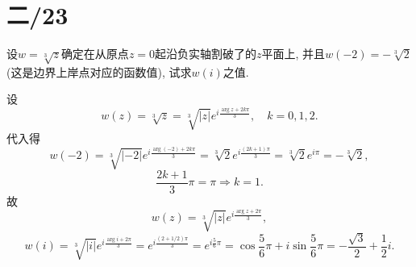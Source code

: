 \documentclass[11pt,a4paper]{article}
\begin{document}
\section{二/23}
\begin{problem}
设$w=\sqrt[3]{z}$确定在从原点$z=0$起沿负实轴割破了的$z$平面上, 并且$w(-2)=-\sqrt[3]{2}$(这是边界上岸点对应的函数值), 试求$w(i)$之值.
\end{problem}
设
$$w(z)=\sqrt[3]{z}=\sqrt[3]{|z|}e^{i\frac{\arg z+2k\pi}{3}},\quad k=0,1,2.$$
代入得
$$w(-2)=\sqrt[3]{|-2|}e^{i\frac{\arg(-2)+2k\pi}{3}}=\sqrt[3]{2}e^{i\frac{(2k+1)\pi}{3}}=\sqrt[3]{2}e^{i\pi}=-\sqrt[3]{2},$$
$$\frac{2k+1}{3}\pi=\pi\Longrightarrow k=1.$$
故
$$w(z)=\sqrt[3]{|z|}e^{i\frac{\arg z+2\pi}{3}},$$
$$w(i)=\sqrt[3]{|i|}e^{i\frac{\arg i+2\pi}{3}}=e^{i\frac{(2+1/2)\pi}{3}}=e^{i\frac{5}{6}\pi}=\cos\frac{5}{6}\pi+i\sin\frac{5}{6}\pi=-\frac{\sqrt{3}}{2}+\frac{1}{2}i.$$
\end{document}
